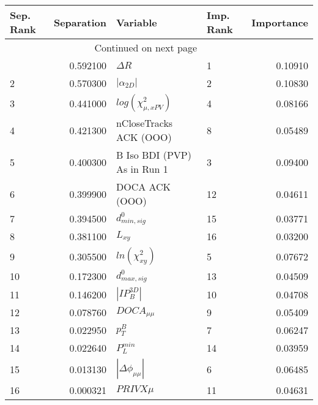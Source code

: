 \usepackage{lscape}

\begin{landscape}
\begin{longtable}{lrllr}
\toprule
Sep. Rank &  Separation &                     Variable & Imp. Rank &  Importance \\
\midrule
\endhead
\midrule
\multicolumn{3}{r}{{Continued on next page}} \\
\midrule
\endfoot

\bottomrule
\endlastfoot
        1 &    0.592100 &                   $\Delta R$ &         1 &     0.10910 \\
        2 &    0.570300 &              $|\alpha_{2D}|$ &         2 &     0.10830 \\
        3 &    0.441000 &    $log(\chi^{2}_{\mu,xPV})$ &         4 &     0.08166 \\
        4 &    0.421300 &       nCloseTracks ACK (OOO) &         8 &     0.05489 \\
        5 &    0.400300 &  B Iso BDI (PVP) As in Run 1 &         3 &     0.09400 \\
        6 &    0.399900 &               DOCA ACK (OOO) &        12 &     0.04611 \\
        7 &    0.394500 &             $d^0_{min, sig}$ &        15 &     0.03771 \\
        8 &    0.381100 &                     $L_{xy}$ &        16 &     0.03200 \\
        9 &    0.305500 &          $ln(\chi^{2}_{xy})$ &         5 &     0.07672 \\
       10 &    0.172300 &             $d^0_{max, sig}$ &        13 &     0.04509 \\
       11 &    0.146200 &              $|IP_{B}^{3D}|$ &        10 &     0.04708 \\
       12 &    0.078760 &              $DOCA_{\mu\mu}$ &         9 &     0.05409 \\
       13 &    0.022950 &                    $p^B_{T}$ &         7 &     0.06247 \\
       14 &    0.022640 &                $P^{min}_{L}$ &        14 &     0.03959 \\
       15 &    0.013130 &     $|\Delta \phi_{\mu\mu}|$ &         6 &     0.06485 \\
       16 &    0.000321 &                   $PRIVX\mu$ &        11 &     0.04631 \\
\end{longtable}

\end{landscape}
